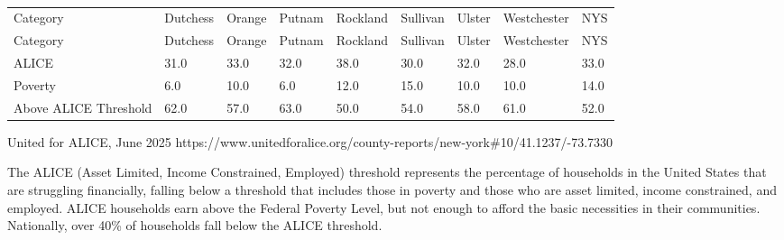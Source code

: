 \documentclass[
  english,
  letterpaper,
]{report}
\begin{document}
\begin{longtable}[]{@{}lllllllll@{}}

\caption{\label{tbl-alice-threshold}ALICE Threshold Percentage, 2023}

\tabularnewline

\caption{}\label{T_180c0}\tabularnewline
\toprule\noalign{}
Category & Dutchess & Orange & Putnam & Rockland & Sullivan & Ulster &
Westchester & NYS \\
\midrule\noalign{}
\endfirsthead
\toprule\noalign{}
Category & Dutchess & Orange & Putnam & Rockland & Sullivan & Ulster &
Westchester & NYS \\
\midrule\noalign{}
\endhead
\bottomrule\noalign{}
\endlastfoot
ALICE & 31.0 & 33.0 & 32.0 & 38.0 & 30.0 & 32.0 & 28.0 & 33.0 \\
Poverty & 6.0 & 10.0 & 6.0 & 12.0 & 15.0 & 10.0 & 10.0 & 14.0 \\
Above ALICE Threshold & 62.0 & 57.0 & 63.0 & 50.0 & 54.0 & 58.0 & 61.0 &
52.0 \\

\end{longtable}

\begin{tcolorbox}[enhanced jigsaw, breakable, leftrule=.75mm, title=\textcolor{quarto-callout-note-color}{\faInfo}\hspace{0.5em}{Source}, bottomrule=.15mm, opacityback=0, left=2mm, colback=white, bottomtitle=1mm, coltitle=black, colbacktitle=quarto-callout-note-color!10!white, colframe=quarto-callout-note-color-frame, opacitybacktitle=0.6, toptitle=1mm, titlerule=0mm, arc=.35mm, rightrule=.15mm, toprule=.15mm]

United for ALICE, June 2025
https://www.unitedforalice.org/county-reports/new-york\#10/41.1237/-73.7330

\end{tcolorbox}

\begin{tcolorbox}[enhanced jigsaw, breakable, leftrule=.75mm, title=\textcolor{quarto-callout-note-color}{\faInfo}\hspace{0.5em}{Note}, bottomrule=.15mm, opacityback=0, left=2mm, colback=white, bottomtitle=1mm, coltitle=black, colbacktitle=quarto-callout-note-color!10!white, colframe=quarto-callout-note-color-frame, opacitybacktitle=0.6, toptitle=1mm, titlerule=0mm, arc=.35mm, rightrule=.15mm, toprule=.15mm]

The ALICE (Asset Limited, Income Constrained, Employed) threshold
represents the percentage of households in the United States that are
struggling financially, falling below a threshold that includes those in
poverty and those who are asset limited, income constrained, and
employed. ALICE households earn above the Federal Poverty Level, but not
enough to afford the basic necessities in their communities. Nationally,
over 40\% of households fall below the ALICE threshold.

\end{tcolorbox}
\end{document}
